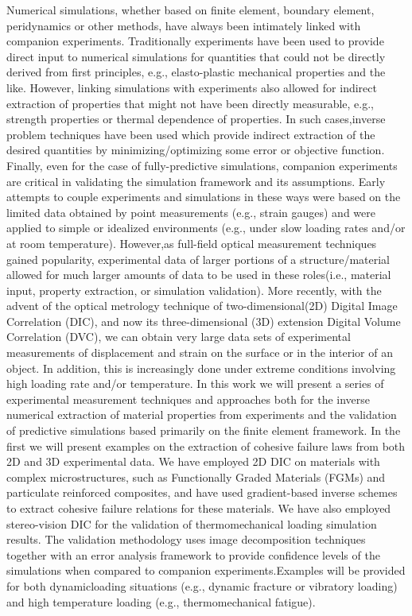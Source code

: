 Numerical simulations, whether based on finite element, boundary element, peridynamics or other methods, have always been intimately linked with companion experiments. Traditionally experiments have been used to provide direct input to numerical simulations for quantities that could not be directly derived from first principles, e.g., elasto-plastic mechanical properties and the like. However, linking simulations with experiments also allowed for indirect extraction of properties that might not have been directly measurable, e.g., strength properties or thermal dependence of properties. In such cases,inverse problem techniques have been used which provide indirect extraction of the desired quantities by minimizing/optimizing some error or objective function. Finally, even for the case of fully-predictive simulations, companion experiments are critical in validating the simulation framework and its assumptions. Early attempts to couple experiments and simulations in these ways were based on the limited data obtained by point measurements (e.g., strain gauges) and were applied to simple or idealized environments (e.g., under slow loading rates and/or at room temperature). However,as full-field optical measurement techniques gained popularity, experimental data of larger portions of a structure/material allowed for much larger amounts of data to be used in these roles(i.e., material input, property extraction, or simulation validation). More recently, with the advent of the optical metrology technique of two-dimensional(2D) Digital Image Correlation (DIC), and now its three-dimensional (3D) extension Digital Volume Correlation (DVC), we can obtain very large data sets of experimental measurements of displacement and strain on the surface or in the interior of an object. In addition, this is increasingly done under extreme conditions involving high loading rate and/or temperature. In this work we will present a series of experimental measurement techniques and approaches both for the inverse numerical extraction of material properties from experiments and the validation of predictive simulations based primarily on the finite element framework. In the first we will present examples on the extraction of cohesive failure laws from both 2D and 3D experimental data. We have employed 2D DIC on materials with complex microstructures, such as Functionally Graded Materials (FGMs) and particulate reinforced composites, and have used gradient-based inverse schemes to extract cohesive failure relations for these materials. We have also employed stereo-vision DIC for the validation of thermomechanical loading simulation results. The validation methodology uses image decomposition techniques together with an error analysis framework to provide confidence levels of the simulations when compared to companion experiments.Examples will be provided for both dynamicloading situations (e.g., dynamic fracture or vibratory loading) and high temperature loading (e.g., thermomechanical fatigue).
